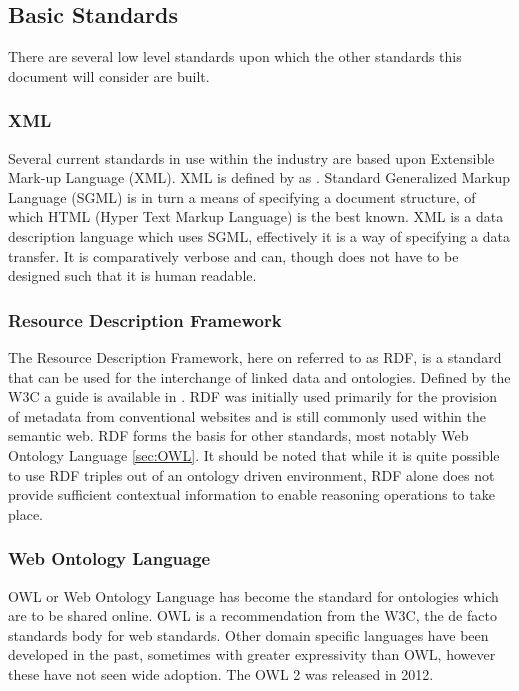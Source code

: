 \subsection{Basic Standards}
There are several low level standards upon which the other standards this document will consider are built.

\subsubsection{XML}
Several current standards in use within the industry are based upon Extensible Mark-up Language (XML). XML is defined by \citet{W3.org2013} as . Standard Generalized Markup Language (SGML) is in turn a means of specifying a document structure, of which HTML (Hyper Text Markup Language) is the best known. XML is a data description language which uses SGML, effectively it is a way of specifying a data transfer. It is comparatively verbose and can, though does not have to be designed such that it is human readable.  

\subsubsection{Resource Description Framework}
The Resource Description Framework, here on referred to as RDF, is a standard that can be used for the interchange of linked data and ontologies. Defined by the W3C a guide is available in \citet{Wood14}. RDF was initially used primarily for the provision of metadata from conventional websites and is still commonly used within the semantic web. RDF forms the basis for other standards, most notably Web Ontology Language \autoref{sec:OWL}. It should be noted that while it is quite possible to use RDF triples out of an ontology driven environment, RDF alone does not provide sufficient contextual information to enable reasoning operations to take place.

\subsubsection{Web Ontology Language}\label{sec:OWL}
OWL or Web Ontology Language has become the standard for ontologies which are to be shared online. OWL is a recommendation from the W3C, the de facto standards body for web standards. Other domain specific languages have been developed in the past, sometimes with greater expressivity than OWL, however these have not seen wide adoption. The OWL 2 was released in 2012.


